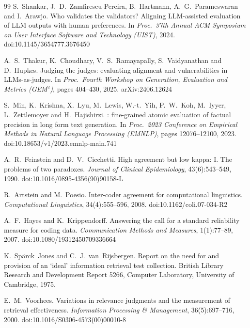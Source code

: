 \documentclass[11pt,a4paper]{article}
\begin{document}
\begin{thebibliography}{99}
S.~Shankar, J.~D.~Zamfirescu-Pereira, B.~Hartmann, A.~G.~Parameswaran and
I.~Arawjo.
\newblock Who validates the validators? {A}ligning {LLM}-assisted evaluation
of {LLM} outputs with human preferences.
\newblock In \emph{Proc.\ 37th Annual ACM Symposium on User Interface
Software and Technology (UIST)}, 2024.
\newblock doi:10.1145/3654777.3676450

A.~S.~Thakur, K.~Choudhary, V.~S.~Ramayapally, S.~Vaidyanathan and
D.~Hupkes.
\newblock Judging the judges: evaluating alignment and vulnerabilities in
{LLMs}-as-judges.
\newblock In \emph{Proc.\ Fourth Workshop on Generation, Evaluation and
Metrics (GEM$^2$)}, pages 404--430, 2025.
\newblock arXiv:2406.12624

S.~Min, K.~Krishna, X.~Lyu, M.~Lewis, W.-t.~Yih, P.~W.~Koh, M.~Iyyer,
L.~Zettlemoyer and H.~Hajishirzi.
: fine-grained atomic evaluation of factual precision in
long form text generation.
\newblock In \emph{Proc.\ 2023 Conference on Empirical Methods in Natural
Language Processing (EMNLP)}, pages 12076--12100, 2023.
\newblock doi:10.18653/v1/2023.emnlp-main.741

A.~R.~Feinstein and D.~V.~Cicchetti.
\newblock High agreement but low kappa: {I}. {T}he problems of two
paradoxes.
\newblock \emph{Journal of Clinical Epidemiology}, 43(6):543--549, 1990.
\newblock doi:10.1016/0895-4356(90)90158-L

R.~Artstein and M.~Poesio.
\newblock Inter-coder agreement for computational linguistics.
\newblock \emph{Computational Linguistics}, 34(4):555--596, 2008.
\newblock doi:10.1162/coli.07-034-R2

A.~F.~Hayes and K.~Krippendorff.
\newblock Answering the call for a standard reliability measure for coding
data.
\newblock \emph{Communication Methods and Measures}, 1(1):77--89, 2007.
\newblock doi:10.1080/19312450709336664

K.~Sp\"arck~Jones and C.~J.~van~Rijsbergen.
\newblock Report on the need for and provision of an `ideal' information
retrieval test collection.
\newblock British Library Research and Development Report 5266, Computer
Laboratory, University of Cambridge, 1975.

E.~M.~Voorhees.
\newblock Variations in relevance judgments and the measurement of retrieval
effectiveness.
\newblock \emph{Information Processing \& Management}, 36(5):697--716, 2000.
\newblock doi:10.1016/S0306-4573(00)00010-8


\end{thebibliography}
\end{document}
